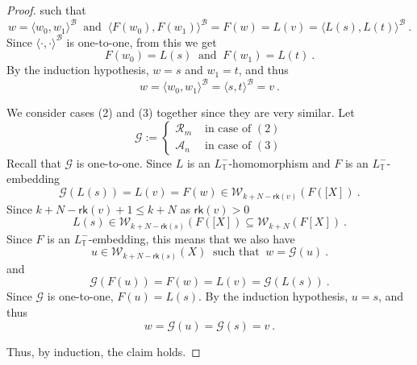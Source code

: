\documentclass[10pt,a4paper, openany,  oldfontcommands]{memoir}
\newtheorem{open problem} [theorem] {Open Problem}
\newtheorem{open question} [theorem] {Open Question}
\begin{document}
\begin{proof}
such that   
\[
   w  =  \langle  w_0, w_1  \rangle^{  \mathcal{B}  }  
\    \mbox{  and   }          \   
\langle  F(w_0) ,   F(w_1)  \rangle^{  \mathcal{B}  }  
= F(w)  =  L(v)  
= 
\langle  L(s), L(t)   \rangle^{  \mathcal{B}  } 
\     .
\]
Since  $  \langle  \cdot  ,  \cdot   \rangle^{  \mathcal{B}  }   $ is one-to-one,  from this  we get 
\[
 F(w_0)  =  L(s)      \    \mbox{  and  }      \         F(w_1)  = L(t)  
 \       .
 \]
By the induction hypothesis,   $  w =  s  $  and  $  w_1  =  t  $,  
and thus  
\[
  w  =  \langle  w_0,  w_1  \rangle^{  \mathcal{B} }   =     \langle  s,  t \rangle^{  \mathcal{B} }     =  v  
  \     .
  \]
 







We consider  cases    (2)  and  (3)  together since they are very similar. 
Let   
\[
\mathcal{G} :=   \begin{cases}
\mathcal{R}_m      &    \mbox{ in case of  }  (2) 
\\
\mathcal{A}_n      &    \mbox{ in case of  }  (3) 
\end{cases}
\]
Recall that    $  \mathcal{G}   $  is one-to-one. 
Since  $L$ is an $L_{  \mathbb{T} }^-  $-homomorphism  and  $F$  is  an   $L_{  \mathbb{T} }^-  $-embedding
\[
\mathcal{G}  \left(   L(s)  \right)     =   
 L(v)  = F(w)   \in  
 \mathcal{W}_{k + N- \mathsf{rk} \left(   v \right)  }  \left(   F  \left([ X  \right]   \right)   
 \     . 
\]
Since  $   k + N- \mathsf{rk}  \left(   v \right)  +1  \leq  k+N $  as  $   \mathsf{rk}  \left(   v \right)   >  0  $
\[
  L(s)  \in  
   \mathcal{W}_{k + N- \mathsf{rk} \left(   s \right)  }  \left(   F  \left([ X  \right]   \right)   
  \subseteq     \mathcal{W}_{ k + N  }  \left(     F  \left[  X   \right]   \right)  
  \      .
  \]
Since  $  F$ is an  $L_{  \mathbb{T} }^-  $-embedding, this means that we also have  
\[
u     \in   \mathcal{W}_{k + N -  \mathsf{rk} \left(   s \right)  }  \left( X  \right)    
 \   \mbox{ such that  }    \   
 w  =   \mathcal{G}   \left(  u  \right) 
   \      .
   \]
and   
\[
\mathcal{G}  \left(   F(u)  \right)     =   
 F(w)  =  L(v)    = 
\mathcal{G}  \left(   L(s)  \right)     
\         .
\]
Since  $   \mathcal{G} $ is one-to-one, $  F(u)  =  L(s)  $. 
By the induction hypothesis,   $u =  s $,     and thus  
\[
  w  =    \mathcal{G} \left(  u   \right)     =       \mathcal{G}   \left(  s   \right)     =   v  
  \     .
  \]




Thus,  by induction,   the claim holds. 




\end{proof}
\end{document}
